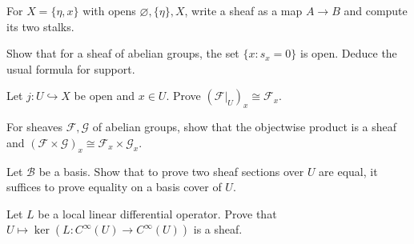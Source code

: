 \begin{exercise}
For $X=\{\eta,x\}$ with opens $\varnothing,\{\eta\},X$, write a sheaf as a map $A\to B$ and compute its two stalks.
\end{exercise}

\begin{exercise}[Support]
Show that for a sheaf of abelian groups, the set $\{x:s_x=0\}$ is open. Deduce the usual formula for support.
\end{exercise}

\begin{exercise}
Let $j:U\hookrightarrow X$ be open and $x\in U$. Prove $(\mathcal F|_U)_x\cong\mathcal F_x$.
\end{exercise}

\begin{exercise}
For sheaves $\mathcal F,\mathcal G$ of abelian groups, show that the objectwise product is a sheaf and $(\mathcal F\times\mathcal G)_x\cong\mathcal F_x\times\mathcal G_x$.
\end{exercise}

\begin{exercise}
Let $\mathcal B$ be a basis. Show that to prove two sheaf sections over $U$ are equal, it suffices to prove equality on a basis cover of $U$.
\end{exercise}

\begin{exercise}
Let $L$ be a local linear differential operator. Prove that $U\mapsto\ker(L:C^\infty(U)\to C^\infty(U))$ is a sheaf.
\end{exercise}